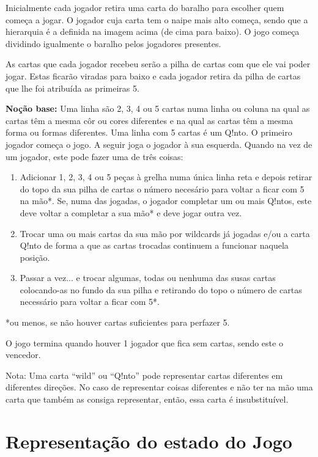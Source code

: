 \documentclass[a4paper]{article}
\begin{document}
	Inicialmente cada jogador retira uma carta do baralho para escolher quem começa a jogar. O jogador cuja carta tem o naipe mais alto começa, sendo que a hierarquia é a definida na imagem acima (de cima para baixo). O jogo começa dividindo igualmente o baralho pelos jogadores presentes.
	
	As cartas que cada jogador recebeu serão a pilha de cartas com que ele vai poder jogar. Estas ficarão viradas para baixo e cada jogador retira da pilha de cartas que lhe foi atribuída as primeiras 5. 
	
	\textbf{Noção base:} Uma linha são 2, 3, 4 ou 5 cartas numa linha ou coluna na qual as cartas têm a mesma côr ou cores diferentes e na qual as cartas têm a mesma forma ou formas diferentes. Uma linha com 5 cartas é um Q!nto.
	O primeiro jogador começa o jogo. A seguir joga o jogador à sua esquerda. Quando na vez de um jogador, este pode fazer uma de três coisas:
	
	\begin{enumerate}
	\item 		Adicionar 1, 2, 3, 4 ou 5 peças à grelha numa única linha reta e depois retirar do topo da sua pilha de cartas o número necesário para voltar a ficar com 5 na mão*.
	Se, numa das jogadas, o jogador completar um ou mais Q!ntos, este deve voltar a completar a sua mão* e deve jogar outra vez.
	\item		Trocar uma ou mais cartas da sua mão por wildcards já jogadas e/ou a carta Q!nto de forma a que as cartas trocadas continuem a funcionar naquela posição.
	\item		Passar a vez... e trocar algumas, todas ou nenhuma das susas cartas colocando-as no fundo da sua pilha e retirando do topo o número de cartas necessário para voltar a ficar com 5*.
	\end{enumerate}
	
	\small
	*ou menos, se não houver cartas suficientes para perfazer 5.
	\normalsize
	
	\bigskip
	
	O jogo termina quando houver 1 jogador que fica sem cartas, sendo este o vencedor.\newline
	
	\small
	\noindent
	Nota: Uma carta “wild” ou “Q!nto” pode representar cartas diferentes em diferentes direções. No caso de representar coisas diferentes e não ter na mão uma carta que também as consiga representar, então, essa carta é insubstituível.
	\normalsize
	
	\section{Representação do estado do Jogo}
	
	
\end{document}

